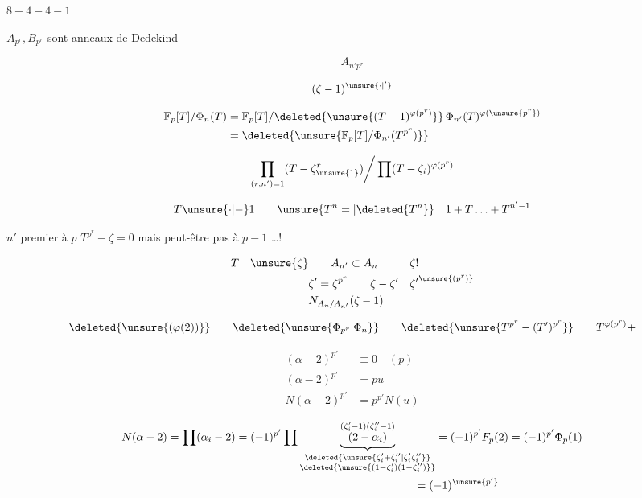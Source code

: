 $8+4-4-1$

 $A_{p^r},B_{p^r}$ sont anneaux de Dedekind

\[
A_{n'p^r}
\]

\[
(\zeta-1)^{\unsure{\cdot|'}}
\]

\[
\begin{aligned}
\mathbb F_p[T]/\Phi_n(T)&=\mathbb F_p[T]/\deleted{\unsure{(T-1)^{\varphi(p^r)}}}\,\Phi_{n'}(T)^{\varphi(\unsure{p^r})}\\
&=\deleted{\unsure{\mathbb F_p[T]/\Phi_{n'}(T^{p^r})}}
\end{aligned}
\]

\[
\prod_{(r,n')=1}(T-\zeta^{r}_{\unsure{1}})\bigg/\prod(T-\zeta_i)^{\varphi(p^r)}
\]

\[
T\unsure{\cdot|-}1\qquad \unsure{T^n=|\deleted{T^n}}\quad1+T\ldots+T^{n'-1}
\]

$n'$ premier à $p$ \hfill $T^{p^r}-\zeta=0$ mais peut-être pas à $p-1$ \ldots !

\[
\begin{aligned}
T\quad\unsure{\zeta}&\qquad A_{n'}\subset A_n&&\zeta!\\
&\zeta'=\zeta^{p^r}\qquad\zeta-\zeta'&&{\zeta'}^{\unsure{(p^r)}}\\
&N_{A_n/A_{n'}}(\zeta-1)
\end{aligned}
\]


\[
\deleted{\unsure{(\varphi(2))}}\qquad\deleted{\unsure{\Phi_{p^r}|\Phi_n}}\qquad\deleted{\unsure{T^{p^r}-(T')^{p^r}}}\qquad T^{\varphi(p^r)}+
\]



\[
\begin{aligned}
(\alpha-2)^{p'}&\equiv0\quad(p)\\
(\alpha-2)^{p'}&=pu\\
N(\alpha-2)^{p'}&=p^{p'}N(u)
\end{aligned}
\]

\[
\begin{aligned}
N(\alpha-2)&=\prod(\alpha_i-2)=(-1)^{p'}\prod
\underset{\substack{\deleted{\unsure{\zeta'_i+\zeta''_i|\zeta'_i\zeta''_i}}\\\deleted{\unsure{(1-\zeta'_i)(1-\zeta''_i)}}}}{\underbrace{\overset{(\zeta'_i-1)(\zeta''_i-1)}{(2-\alpha_i)}}}
=(-1)^{p'}F_p(2)=(-1)^{p'}\Phi_p(1)\\
&\hspace{22em}=(-1)^{\unsure{p'}}
\end{aligned}
\]

